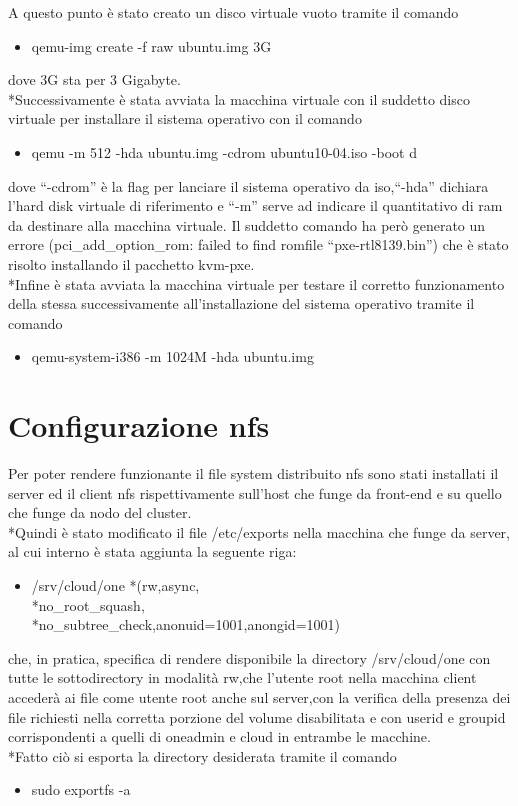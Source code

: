 \documentclass[	
	DIV=calc,
	paper=a4,
	fontsize=11pt,
	onecolumn
]{scrartcl} %
\begin{document}
A questo punto è stato creato un disco virtuale vuoto tramite il comando
\begin{itemize}
	\item qemu-img create -f raw ubuntu.img 3G
\end{itemize}
dove 3G sta per 3 Gigabyte.
\\*Successivamente è stata avviata la macchina virtuale con il suddetto disco virtuale per installare il sistema operativo con il comando
\begin{itemize}
	\item qemu -m 512 -hda ubuntu.img -cdrom ubuntu10-04.iso -boot d
\end{itemize}
dove ``-cdrom'' è la flag per lanciare il sistema operativo da iso,``-hda'' dichiara l'hard disk virtuale di riferimento e ``-m'' serve ad indicare il quantitativo di ram da destinare alla macchina virtuale.
Il suddetto comando ha però generato un errore (pci\_add\_option\_rom: failed to find romfile ``pxe-rtl8139.bin'') che è stato risolto installando il pacchetto kvm-pxe.
\\*Infine è stata avviata la macchina virtuale per testare il corretto funzionamento della stessa successivamente all'installazione del sistema operativo tramite il comando
\begin{itemize}
	\item qemu-system-i386 -m 1024M -hda ubuntu.img
\end{itemize}

\section*{Configurazione nfs}
Per poter rendere funzionante il file system distribuito nfs sono stati installati il server ed il client nfs rispettivamente sull'host che funge da front-end e su quello che funge da nodo del cluster.
\\*Quindi è stato modificato il file /etc/exports nella macchina che funge da server, al cui interno è stata aggiunta la seguente riga:
\begin{itemize}
	\item /srv/cloud/one *(rw,async, \\*no\_root\_squash, \\*no\_subtree\_check,anonuid=1001,anongid=1001)
\end{itemize}
che, in pratica, specifica di rendere disponibile la directory /srv/cloud/one con tutte le sottodirectory in modalità rw,che l'utente root nella macchina client accederà ai file come utente root anche sul server,con la verifica della presenza dei file richiesti nella corretta porzione del volume disabilitata e con userid e groupid corrispondenti a quelli di oneadmin e cloud in entrambe le macchine.
\\*Fatto ciò si esporta la directory desiderata tramite il comando
\begin{itemize}
	\item sudo exportfs -a
\end{itemize}
\end{document}

